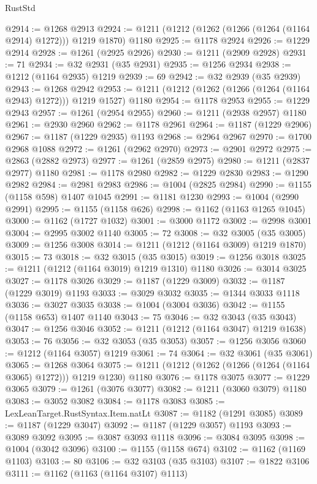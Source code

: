 \begin{lexlean}{RustStd}
\begin{coremodule}
{\begin{coremodule}
{{{{{{{{{{{{{{{{{{{{{{{{{{{{{{{{@2914 := @1268 @2913
@2924 := @1211 (@1212 (@1262 (@1266 (@1264 (@1164 @2914) @1272))) @1219 @1870) @1180
@2925 := @1178 @2924
@2926 := @1229 @2914
@2928 := @1261 (@2925 @2926)
@2930 := @1211 (@2909 @2928)
@2931 := 71
@2934 := @32 @2931 (@35 @2931)
@2935 := @1256 @2934
@2938 := @1212 (@1164 @2935) @1219
@2939 := 69
@2942 := @32 @2939 (@35 @2939)
@2943 := @1268 @2942
@2953 := @1211 (@1212 (@1262 (@1266 (@1264 (@1164 @2943) @1272))) @1219 @1527) @1180
@2954 := @1178 @2953
@2955 := @1229 @2943
@2957 := @1261 (@2954 @2955)
@2960 := @1211 (@2938 @2957) @1180
@2961 := @2930 @2960
@2962 := @1178 @2961
@2964 := @1187 (@1229 @2906)
@2967 := @1187 (@1229 @2935) @1193
@2968 := @2964 @2967
@2970 := @1700 @2968 @1088
@2972 := @1261 (@2962 @2970)
@2973 := @2901 @2972
@2975 := @2863 (@2882 @2973)
@2977 := @1261 (@2859 @2975)
@2980 := @1211 (@2837 @2977) @1180
@2981 := @1178 @2980
@2982 := @1229 @2830
@2983 := @1290 @2982
@2984 := @2981 @2983
@2986 := @1004 (@2825 @2984)
@2990 := @1155 (@1158 @598) @1407 @1045
@2991 := @1181 @1230
@2993 := @1004 (@2990 @2991)
@2995 := @1155 (@1158 @626)
@2998 := @1162 (@1163 @1265 @1045)
@3000 := @1162 (@1727 @1032)
@3001 := @3000 @1172
@3002 := @2998 @3001
@3004 := @2995 @3002 @1140
@3005 := 72
@3008 := @32 @3005 (@35 @3005)
@3009 := @1256 @3008
@3014 := @1211 (@1212 (@1164 @3009) @1219 @1870)
@3015 := 73
@3018 := @32 @3015 (@35 @3015)
@3019 := @1256 @3018
@3025 := @1211 (@1212 (@1164 @3019) @1219 @1310) @1180
@3026 := @3014 @3025
@3027 := @1178 @3026
@3029 := @1187 (@1229 @3009)
@3032 := @1187 (@1229 @3019) @1193
@3033 := @3029 @3032
@3035 := @1344 @3033 @1118
@3036 := @3027 @3035
@3038 := @1004 (@3004 @3036)
@3042 := @1155 (@1158 @653) @1407 @1140
@3043 := 75
@3046 := @32 @3043 (@35 @3043)
@3047 := @1256 @3046
@3052 := @1211 (@1212 (@1164 @3047) @1219 @1638)
@3053 := 76
@3056 := @32 @3053 (@35 @3053)
@3057 := @1256 @3056
@3060 := @1212 (@1164 @3057) @1219
@3061 := 74
@3064 := @32 @3061 (@35 @3061)
@3065 := @1268 @3064
@3075 := @1211 (@1212 (@1262 (@1266 (@1264 (@1164 @3065) @1272))) @1219 @1230) @1180
@3076 := @1178 @3075
@3077 := @1229 @3065
@3079 := @1261 (@3076 @3077)
@3082 := @1211 (@3060 @3079) @1180
@3083 := @3052 @3082
@3084 := @1178 @3083
@3085 := LexLeanTarget.RustSyntax.Item.natLt
@3087 := @1182 (@1291 @3085)
@3089 := @1187 (@1229 @3047)
@3092 := @1187 (@1229 @3057) @1193
@3093 := @3089 @3092
@3095 := @3087 @3093 @1118
@3096 := @3084 @3095
@3098 := @1004 (@3042 @3096)
@3100 := @1155 (@1158 @674)
@3102 := @1162 (@1169 @1103)
@3103 := 80
@3106 := @32 @3103 (@35 @3103)
@3107 := @1822 @3106
@3111 := @1162 (@1163 (@1164 @3107) @1113)
}}}}}}}}}}}}}}}}}}}}}}}}}}}}}}}}
\end{coremodule}}
\end{coremodule}
\end{lexlean}
